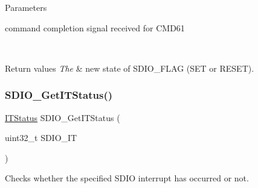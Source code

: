 \begin{DoxyParams}{Parameters}
\begin{DoxyItemize}
command completion signal received for C\+M\+D61 \end{DoxyItemize}
\\
\hline
\end{DoxyParams}

\begin{DoxyRetVals}{Return values}
{\em The} & new state of S\+D\+I\+O\+\_\+\+F\+L\+AG (S\+ET or R\+E\+S\+ET). \\
\hline
\end{DoxyRetVals}
\mbox{\label{group___s_d_i_o___exported___functions_ga2d64af1f3df0f99cb518f9a89bbd02ac}} 
\subsubsection{\texorpdfstring{SDIO\_GetITStatus()}{SDIO\_GetITStatus()}}
{\footnotesize\ttfamily \mbox{\hyperlink{group___exported__types_gaacbd7ed539db0aacd973a0f6eca34074}{I\+T\+Status}} S\+D\+I\+O\+\_\+\+Get\+I\+T\+Status (\begin{DoxyParamCaption}\item[{uint32\+\_\+t}]{S\+D\+I\+O\+\_\+\+IT }\end{DoxyParamCaption})}



Checks whether the specified S\+D\+IO interrupt has occurred or not. 


